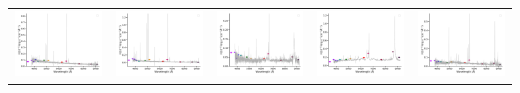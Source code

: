 \begin{center}
\begin{longtable}{l l l l l }
    \includegraphics[width=0.2\linewidth, clip]{Figs/Figs-sdss/spec-1106-52912-0194-STRIPE82-0129-031160.pdf} & \includegraphics[width=0.2\linewidth, clip]{Figs/Figs-sdss/spec-1106-52912-0456-STRIPE82-0130-042161.pdf} & \includegraphics[width=0.2\linewidth, clip]{Figs/Figs-sdss/spec-1115-52914-0588-STRIPE82-0108-009933.pdf} & \includegraphics[width=0.2\linewidth, clip]{Figs/Figs-sdss/spec-1116-52932-0478-STRIPE82-0104-027921.pdf} & \includegraphics[width=0.2\linewidth, clip]{Figs/Figs-sdss/spec-1117-52885-0395-STRIPE82-0100-021070.pdf} \\

\end{longtable}
\end{center}
